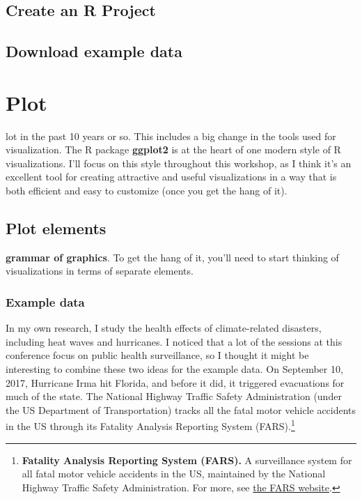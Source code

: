 \documentclass[]{tufte-book}
\begin{document}
\hypertarget{create-an-r-project}{%
\section{Create an R Project}\label{create-an-r-project}}

\hypertarget{download-example-data}{%
\section{Download example data}\label{download-example-data}}

\hypertarget{plot}{%
\chapter{Plot}\label{plot}}

 lot in the past 10 years or so. This
includes a big
change in the tools used for visualization. The R package \textbf{ggplot2} \citep{R-ggplot2}
is at the heart of one modern style of R visualizations. I'll focus on this style
throughout this workshop, as I think it's an excellent tool for creating
attractive and useful visualizations in a way that is both efficient and easy
to customize (once you get the hang of it).

\hypertarget{plot-elements}{%
\section{Plot elements}\label{plot-elements}}

 \textbf{grammar of graphics}. To get the hang
of it, you'll need to start thinking of visualizations in terms of separate elements.

\hypertarget{example-data}{%
\subsection{Example data}\label{example-data}}

In my own research, I study the health effects of climate-related disasters, including
heat waves and hurricanes. I noticed that a lot of the sessions at this conference
focus on public health surveillance, so I thought it might be interesting to combine
these two ideas for the example data. On September 10, 2017, Hurricane Irma hit Florida,
and before it did, it triggered evacuations for much of the state. The National Highway
Traffic Safety Administration (under the US Department of Transportation) tracks all
the fatal motor vehicle accidents in the US through its Fatality Analysis Reporting
System (FARS).\footnote{\textbf{Fatality Analysis Reporting System (FARS).} A surveillance system
  for all fatal motor vehicle accidents in the US, maintained by the National Highway
  Traffic Safety Administration. For more, see
  \href{https://www.nhtsa.gov/research-data/fatality-analysis-reporting-system-fars}{the FARS website}.}
\end{document}
